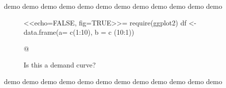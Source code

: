 \documentclass{report}
\begin{document}
demo demo demo demo demo demo demo demo demo demo demo demo 

\begin{figure}[h]
 \begin{center}
<<echo=FALSE, fig=TRUE>>=
require(ggplot2)
df <- data.frame(a= c(1:10), b = c (10:1))

@
  \caption{Is this a demand curve?}
 \end{center}
\end{figure}

demo demo demo demo demo demo demo demo demo demo demo demo 
\end{document}
